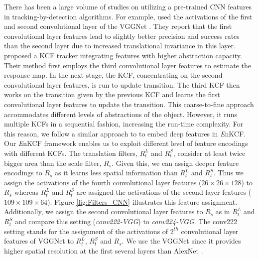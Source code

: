 \documentclass[10pt,twocolumn,letterpaper]{article}
\begin{document}
There has been a large volume of studies on utilizing a pre-trained
CNN features in tracking-by-detection algorithms. For example,
\cite{danelljan2015convolutional} used the activations of the first
and second convolutional layer of the VGGNet \cite{simonyan2014very}.
They report that the first convolutional layer features lead to
slightly better precision and success rates than the second layer due
to increased translational invariance in this layer. \cite{ma2015hierarchical}
proposed a KCF tracker integrating features with higher abstraction
capacity.  Their method first employs the third convolutional layer
features to estimate the response map. In the next stage, the KCF,
concentrating on the second convolutional layer features, is run to
update transition. The third KCF then works on the transition given by
the previous KCF and learns the first convolutional layer features to
update the transition. This coarse-to-fine approach accommodates
different levels of abstractions of the object. However, it runs
multiple KCFs in a sequential fashion, increasing the run-time
complexity. For this reason, we follow a similar approach to
\cite{danelljan2015convolutional} to embed deep features in {\it
  E}nKCF. Our {\it E}nKCF framework enables us to exploit different
level of feature encodings with different KCFs. The translation
filters, $R_{t}^{L}$ and $R_{t}^{S}$, consider at least twice bigger
area than the scale filter, $R_{s}$. Given this, we can assign deeper
feature encodings to $R_{s}$ as it learns less spatial information
than $R_{t}^{L}$ and $R_{t}^{S}$. Thus we assign the activations of
the fourth convolutional layer features ($26\times26\times128$) to
$R_{s}$ whereas $R_{t}^{L}$ and $R_{t}^{S}$ are assigned the
activations of the second layer features
($109\times109\times64$). Figure \ref{fig:Filters_CNN} illustrates
this feature assignment. Additionally, we assign the second
convolutional layer features to $R_{s}$ as in $R_{t}^{L}$ and
$R_{t}^{S}$ and compare this setting (\textit{conv222-VGG}) to
\textit{conv224-VGG}. The conv222 setting stands for the assignment of 
the activations of $2^{th}$ convolutional layer features
of VGGNet to $R_{t}^{L}$, $R_{t}^{S}$ and $R_{s}$. We use the VGGNet 
since it provides higher spatial resolution at the first several layers than AlexNet
\cite{krizhevsky2012imagenet}.
\end{document}
